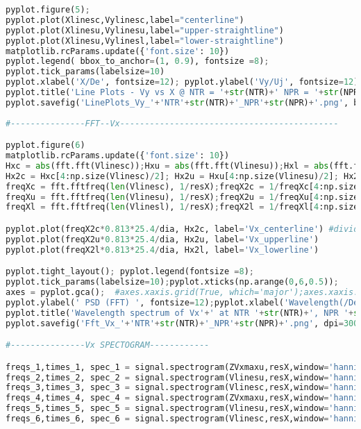 \begin{lstlisting}[language=Python]
pyplot.figure(5);
pyplot.plot(Xlinesc,Vylinesc,label="centerline")
pyplot.plot(Xlinesu,Vylinesu,label="upper-straightline")  
pyplot.plot(Xlinesu,Vylinesl,label="lower-straightline")  
matplotlib.rcParams.update({'font.size': 10})
pyplot.legend( bbox_to_anchor=(1, 0.9), fontsize =8); 
pyplot.tick_params(labelsize=10)
pyplot.xlabel('X/De', fontsize=12); pyplot.ylabel('Vy/Uj', fontsize=12)    
pyplot.title('Line Plots - Vy vs X @ NTR = '+str(NTR)+' NPR = '+str(NPR), y = 1.02, fontsize=14)
pyplot.savefig('LinePlots_Vy_'+'NTR'+str(NTR)+'_NPR'+str(NPR)+'.png', bbox_inches='tight', dpi=300)
   
#---------------FFT--Vx--------------------------------------------

pyplot.figure(6)
matplotlib.rcParams.update({'font.size': 10})
Hxc = abs(fft.fft(Vlinesc));Hxu = abs(fft.fft(Vlinesu));Hxl = abs(fft.fft(Vlinesl));
Hx2c = Hxc[4:np.size(Vlinesc)/2]; Hx2u = Hxu[4:np.size(Vlinesu)/2]; Hx2l = Hxl[4:np.size(Vlinesl)/2]; 
freqXc = fft.fftfreq(len(Vlinesc), 1/resX);freqX2c = 1/freqXc[4:np.size(Vlinesc)/2] 
freqXu = fft.fftfreq(len(Vlinesu), 1/resX);freqX2u = 1/freqXu[4:np.size(Vlinesu)/2]
freqXl = fft.fftfreq(len(Vlinesl), 1/resX);freqX2l = 1/freqXl[4:np.size(Vlinesl)/2]

pyplot.plot(freqX2c*0.813*25.4/dia, Hx2c, label='Vx_centerline') #divide by 0.813 since sampling rate is adjusted to that dia i.e., 1/resX of 0.813
pyplot.plot(freqX2u*0.813*25.4/dia, Hx2u, label='Vx_upperline')
pyplot.plot(freqX2l*0.813*25.4/dia, Hx2l, label='Vx_lowerline')

pyplot.tight_layout(); pyplot.legend(fontsize =8);
pyplot.tick_params(labelsize=10);pyplot.xticks(np.arange(0,6,0.5));
axes = pyplot.gca();  #axes.xaxis.grid(True, which='major');axes.xaxis.grid(False, which='minor');#pyplot.minorticks_on()
pyplot.ylabel(' PSD (FFT) ', fontsize=12);pyplot.xlabel('Wavelength(/De)', fontsize=12)
pyplot.title('Wavelength spectrum of Vx'+' at NTR '+str(NTR)+', NPR '+str(NPR), fontsize=15, y=1.01)
pyplot.savefig('Fft_Vx_'+'NTR'+str(NTR)+'_NPR'+str(NPR)+'.png', dpi=300, bbox_inches='tight')

#---------------Vx SPECTOGRAM------------

freqs_1,times_1, spec_1 = signal.spectrogram(ZVxmaxu,resX,window='hanning', nperseg=np.size(ZVxmaxu)/6, noverlap=np.size(ZVxmaxu)/6.04,detrend=False,scaling='spectrum');
freqs_2,times_2, spec_2 = signal.spectrogram(Vlinesu,resX,window='hanning', nperseg=np.size(Vlinesu)/6.00, noverlap=np.size(Vlinesu)/6.04,detrend=False, scaling='spectrum');
freqs_3,times_3, spec_3 = signal.spectrogram(Vlinesc,resX,window='hanning', nperseg=np.size(Vlinesc)/6.00, noverlap=np.size(Vlinesc)/6.04,detrend=False, scaling='spectrum');
freqs_4,times_4, spec_4 = signal.spectrogram(ZVxmaxu,resX,window='hanning', nperseg=np.size(ZVxmaxu)/2.00, noverlap=np.size(ZVxmaxu)/2.01,detrend=False, scaling='spectrum');
freqs_5,times_5, spec_5 = signal.spectrogram(Vlinesu,resX,window='hanning', nperseg=np.size(Vlinesu)/2.00, noverlap=np.size(Vlinesu)/2.01,detrend=False, scaling='spectrum');
freqs_6,times_6, spec_6 = signal.spectrogram(Vlinesc,resX,window='hanning', nperseg=np.size(Vlinesc)/2.00, noverlap=np.size(Vlinesc)/2.01,detrend=False, scaling='spectrum');


\end{lstlisting}
